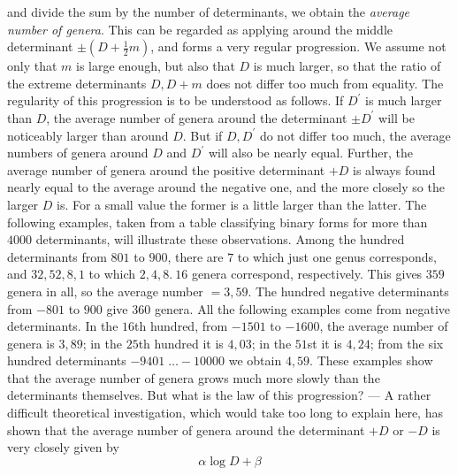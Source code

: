 and divide the sum by the number of determinants, we obtain the \textit{average number of genera}. This can be regarded as applying around the middle determinant \(\pm(D+\frac12m)\), and forms a very regular progression. We assume not only that \(m\) is large enough, but also that \(D\) is much larger, so that the ratio of the extreme determinants \(D,D+m\) does not differ too much from equality. The regularity of this progression is to be understood as follows. If \(D^\prime\) is much larger than \(D\), the average number of genera around the determinant \(\pm D^\prime\) will be noticeably larger than around \(D\). But if \(D,D^\prime\) do not differ too much, the average numbers of genera around \(D\) and \(D^\prime\) will also be nearly equal. Further, the average number of genera around the positive determinant \(+D\) is always found nearly equal to the average around the negative one, and the more closely so the larger \(D\) is. For a small value the former is a little larger than the latter. The following examples, taken from a table classifying binary forms for more than \(4000\) determinants, will illustrate these observations. Among the hundred determinants from \(801\) to \(900\), there are \(7\) to which just one genus corresponds, and \(32,52,8,1\) to which \(2,4,8.\ 16\) genera correspond, respectively. This gives \(359\) genera in all, so the average number \(=3{,}59\). The hundred negative determinants from \(-801\) to \(900\) give \(360\) genera. All the following examples come from negative determinants. In the \(16\)th hundred, from \(-1501\) to \(-1600\), the average number of genera is \(3{,}89\); in the \(25\)th hundred it is \(4{,}03\); in the \(51\)st it is \(4{,}24\); from the six hundred determinants \(-9401\;\ldots -10000\) we obtain \(4{,}59\). These examples show that the average number of genera grows much more slowly than the determinants themselves. But what is the law of this progression? — A rather difficult theoretical investigation, which would take too long to explain here, has shown that the average number of genera around the determinant \(+D\) or \(-D\) is very closely given by
\[\alpha\log D+\beta\]

